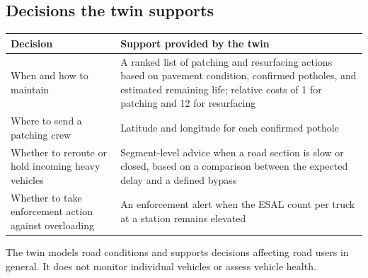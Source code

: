 \documentclass[11pt,a4paper]{article}
\renewcommand{\arraystretch}{1.35}
\begin{document}
\subsection{Decisions the twin supports}
\renewcommand{\arraystretch}{1.6}
\begin{center}
\small
\begin{tabularx}{\textwidth}{@{}L{4.2cm} X@{}}
\toprule
\textbf{Decision} & \textbf{Support provided by the twin}\\
\midrule
When and how to maintain & A ranked list of patching and resurfacing actions based on pavement condition, confirmed potholes, and estimated remaining life; relative costs of 1 for patching and 12 for resurfacing\\[6pt]
Where to send a patching crew & Latitude and longitude for each confirmed pothole\\[6pt]
Whether to reroute or hold incoming heavy vehicles & Segment-level advice when a road section is slow or closed, based on a comparison between the expected delay and a defined bypass\\[6pt]
Whether to take enforcement action against overloading & An enforcement alert when the ESAL count per truck at a station remains elevated\\
\bottomrule
\end{tabularx}
\end{center}
\renewcommand{\arraystretch}{1.35}

The twin models road conditions and supports decisions affecting road users in general. It does not monitor individual vehicles or assess vehicle health.
\end{document}

